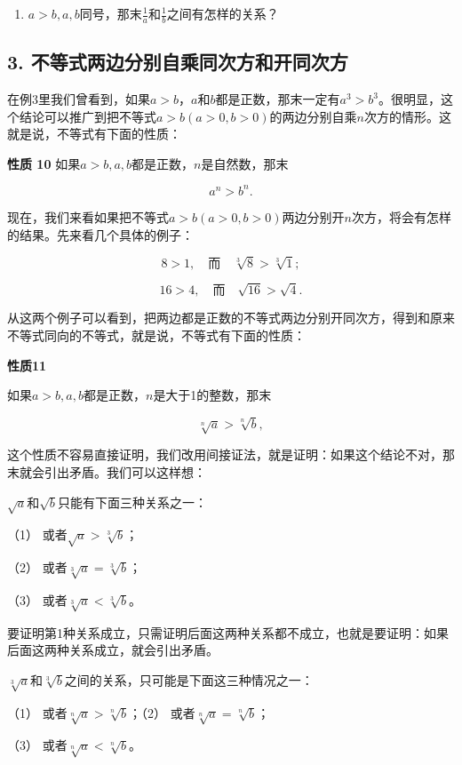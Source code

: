 \begin{enumerate}[start=4]
\item
  \(a > b, a, b\)同号，那末\(\frac{1}{a}\)和\(\frac{1}{b}\)之间有怎样的关系？
\end{enumerate}

\subsection{3. 不等式两边分别自乘同次方和开同次方}

在例3里我们曾看到，如果\(a > b\)，\(a\)和\(b\)都是正数，那末一定有\(a^3 > b^3\)。很明显，这个结论可以推广到把不等式\(a > b (a > 0, b > 0)\)的两边分别自乘\(n\)次方的情形。这就是说，不等式有下面的性质：

\textbf{性质 10} 如果\(a > b, a, b\)都是正数，\(n\)是自然数，那末

\[
a^{n} > b^{n}.
\]

现在，我们来看如果把不等式\(a > b (a > 0, b > 0)\)两边分别开\(n\)次方，将会有怎样的结果。先来看几个具体的例子：

\[
8 > 1, \quad \text{而} \quad \sqrt[3]{8} > \sqrt[3]{1};
\]

\[
16 > 4, \quad \text{而} \quad \sqrt{16} > \sqrt{4}.
\]

从这两个例子可以看到，把两边都是正数的不等式两边分别开同次方，得到和原来不等式同向的不等式，就是说，不等式有下面的性质：

\textbf{性质11}

如果\(a > b, a, b\)都是正数，\(n\)是大于1的整数，那末

\[
\sqrt[n]{a} > \sqrt[n]{b},
\]

这个性质不容易直接证明，我们改用间接证法，就是证明：如果这个结论不对，那末就会引出矛盾。我们可以这样想：

\(\sqrt{a}\)和\(\sqrt{b}\)只能有下面三种关系之一：

（1） 或者\(\sqrt{a} > \sqrt[3]{b}\)；

（2） 或者\(\sqrt[3]{a} = \sqrt[3]{b}\)；

（3） 或者\(\sqrt[3]{a} < \sqrt[3]{b}\)。

要证明第1种关系成立，只需证明后面这两种关系都不成立，也就是要证明：如果后面这两种关系成立，就会引出矛盾。

\(\sqrt[3]{a}\)和\(\sqrt[3]{b}\)之间的关系，只可能是下面这三种情况之一：

（1） 或者\(\sqrt[n]{a} > \sqrt[n]{b}\)；（2）
或者\(\sqrt[n]{a} = \sqrt[n]{b}\)；

（3） 或者\(\sqrt[n]{a} < \sqrt[n]{b}\)。

